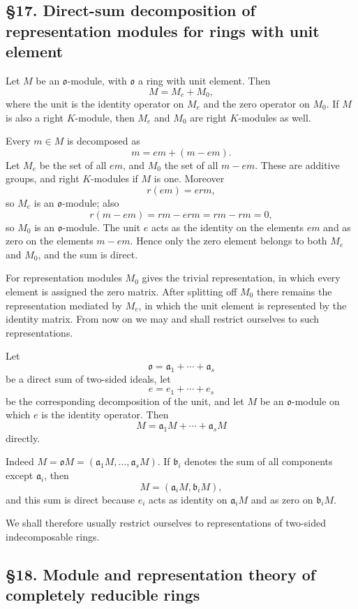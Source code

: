 \documentclass[
  11pt,
]{article}
\begin{document}
\subsection{§17. Direct-sum decomposition of representation modules for
rings with unit
element}\label{direct-sum-decomposition-of-representation-modules-for-rings-with-unit-element}

Let \(M\) be an \(\mathfrak{o}\)-module, with \(\mathfrak{o}\) a ring
with unit element. Then \[
  M=M_e+M_0,
\] where the unit is the identity operator on \(M_e\) and the zero
operator on \(M_0\). If \(M\) is also a right \(K\)-module, then \(M_e\)
and \(M_0\) are right \(K\)-modules as well.

Every \(m\in M\) is decomposed as \[
  m=em+(m-em).
\] Let \(M_e\) be the set of all \(em\), and \(M_0\) the set of all
\(m-em\). These are additive groups, and right \(K\)-modules if \(M\) is
one. Moreover \[
  r(em)=er m,
\] so \(M_e\) is an \(\mathfrak{o}\)-module; also \[
  r(m-em)=rm-erm=rm-rm=0,
\] so \(M_0\) is an \(\mathfrak{o}\)-module. The unit \(e\) acts as the
identity on the elements \(em\) and as zero on the elements \(m-em\).
Hence only the zero element belongs to both \(M_e\) and \(M_0\), and the
sum is direct.

For representation modules \(M_0\) gives the trivial representation, in
which every element is assigned the zero matrix. After splitting off
\(M_0\) there remains the representation mediated by \(M_e\), in which
the unit element is represented by the identity matrix. From now on we
may and shall restrict ourselves to such representations.

Let \[
  \mathfrak{o}=\mathfrak a_1+\cdots+\mathfrak a_s
\] be a direct sum of two-sided ideals, let \[
  e=e_1+\cdots+e_s
\] be the corresponding decomposition of the unit, and let \(M\) be an
\(\mathfrak{o}\)-module on which \(e\) is the identity operator. Then \[
  M=\mathfrak a_1M+\cdots+\mathfrak a_sM
\] directly.

Indeed \(M=\mathfrak{o}M=(\mathfrak a_1M,\ldots,\mathfrak a_sM)\). If
\(\mathfrak b_i\) denotes the sum of all components except
\(\mathfrak a_i\), then \[
  M=(\mathfrak a_iM,\mathfrak b_iM),
\] and this sum is direct because \(e_i\) acts as identity on
\(\mathfrak a_iM\) and as zero on \(\mathfrak b_iM\).

We shall therefore usually restrict ourselves to representations of
two-sided indecomposable rings.

\subsection{§18. Module and representation theory of completely
reducible
rings}\label{module-and-representation-theory-of-completely-reducible-rings}
\end{document}
